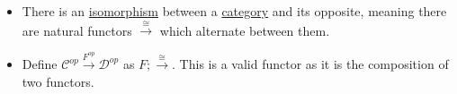 \begin{itemize}
    \item  There is an \href{doc/1 math/Seven Sketches in Compositionality/Chapter 3: Databases/2 Categories/5 Isomorphisms in a category/1 Isomorphism}{isomorphism} between a \href{doc/1 math/Seven Sketches in Compositionality/Chapter 3: Databases/2 Categories/1 Free Categories/1 Category}{category} and its opposite, meaning there are natural functors $\overset{\cong}\rightarrow$ which alternate between them.
    \item Define $\mathcal{C}^{op}\xrightarrow{F^{op}}\mathcal{D}^{op}$ as $F ; \overset{\cong}\rightarrow$. This is a valid functor as it is the composition of two functors.
  \end{itemize}
